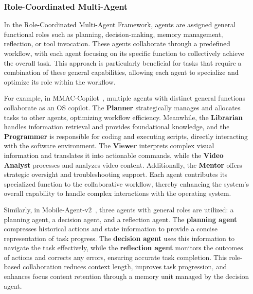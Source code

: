 \subsubsection{Role-Coordinated Multi-Agent}
\label{subsubsec: Role-Coordinated Multi-Agent}

In the Role-Coordinated Multi-Agent Framework, agents are assigned general functional roles such as planning, decision-making, memory management, reflection, or tool invocation. These agents collaborate through a predefined workflow, with each agent focusing on its specific function to collectively achieve the overall task. This approach is particularly beneficial for tasks that require a combination of these general capabilities, allowing each agent to specialize and optimize its role within the workflow.

For example, in MMAC-Copilot~\cite{song2024mmac}, multiple agents with distinct general functions collaborate as an OS copilot. The \textbf{Planner} strategically manages and allocates tasks to other agents, optimizing workflow efficiency. Meanwhile, the \textbf{Librarian} handles information retrieval and provides foundational knowledge, and the \textbf{Programmer} is responsible for coding and executing scripts, directly interacting with the software environment. The \textbf{Viewer} interprets complex visual information and translates it into actionable commands, while the \textbf{Video Analyst} processes and analyzes video content. Additionally, the \textbf{Mentor} offers strategic oversight and troubleshooting support. Each agent contributes its specialized function to the collaborative workflow, thereby enhancing the system's overall capability to handle complex interactions with the operating system.


Similarly, in Mobile-Agent-v2~\cite{wang2024mobileagentv2}, three agents with general roles are utilized: a planning agent, a decision agent, and a reflection agent. The \textbf{planning agent} compresses historical actions and state information to provide a concise representation of task progress. The \textbf{decision agent} uses this information to navigate the task effectively, while the \textbf{reflection agent} monitors the outcomes of actions and corrects any errors, ensuring accurate task completion. This role-based collaboration reduces context length, improves task progression, and enhances focus content retention through a memory unit managed by the decision agent.

